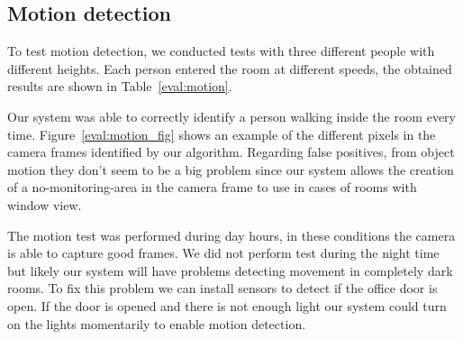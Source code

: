 


\subsection{Motion detection}

To test motion detection, we conducted tests with three different people with different heights. Each person entered the room at different speeds, the obtained results are shown in Table~\ref{eval:motion}.

Our system was able to correctly identify a person walking inside the room every time. Figure~\ref{eval:motion_fig} shows an example of the different pixels in the camera frames identified by our algorithm. Regarding false positives, from object motion they don't seem to be a big problem since our system allows the creation of a no-monitoring-area in the camera frame to use in cases of rooms with window view.

The motion test was performed during day hours, in these conditions the camera is able to capture good frames. We did not perform test during the night time  but likely our system will have problems detecting movement in completely dark rooms. To fix this problem we can install sensors to detect if the office door is open. If the door is opened and there is not enough light our system could turn on the lights momentarily to enable motion detection.



